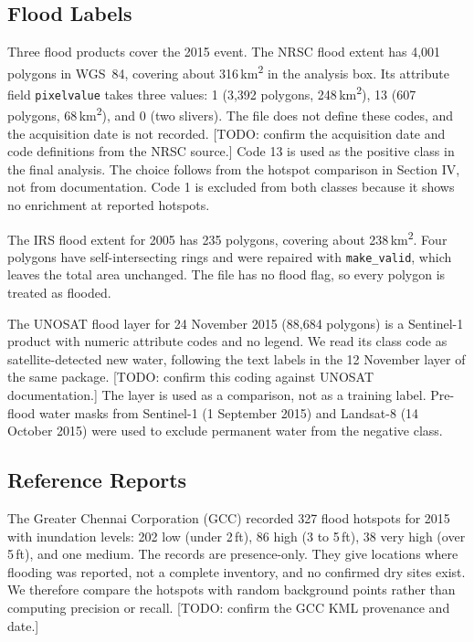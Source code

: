 \documentclass[conference]{IEEEtran}
\begin{document}
\subsection{Flood Labels}
Three flood products cover the 2015 event. The NRSC flood extent has 4,001 polygons in WGS~84, covering about 316\,km\textsuperscript{2} in the analysis box. Its attribute field \texttt{pixelvalue} takes three values: 1 (3,392 polygons, 248\,km\textsuperscript{2}), 13 (607 polygons, 68\,km\textsuperscript{2}), and 0 (two slivers). The file does not define these codes, and the acquisition date is not recorded. [TODO: confirm the acquisition date and code definitions from the NRSC source.] Code 13 is used as the positive class in the final analysis. The choice follows from the hotspot comparison in Section IV, not from documentation. Code 1 is excluded from both classes because it shows no enrichment at reported hotspots.

The IRS flood extent for 2005 has 235 polygons, covering about 238\,km\textsuperscript{2}. Four polygons have self-intersecting rings and were repaired with \texttt{make\_valid}, which leaves the total area unchanged. The file has no flood flag, so every polygon is treated as flooded.

The UNOSAT flood layer for 24 November 2015 (88,684 polygons) is a Sentinel-1 product with numeric attribute codes and no legend. We read its class code as satellite-detected new water, following the text labels in the 12 November layer of the same package. [TODO: confirm this coding against UNOSAT documentation.] The layer is used as a comparison, not as a training label. Pre-flood water masks from Sentinel-1 (1 September 2015) and Landsat-8 (14 October 2015) were used to exclude permanent water from the negative class.

\subsection{Reference Reports}
The Greater Chennai Corporation (GCC) recorded 327 flood hotspots for 2015 with inundation levels: 202 low (under 2\,ft), 86 high (3 to 5\,ft), 38 very high (over 5\,ft), and one medium. The records are presence-only. They give locations where flooding was reported, not a complete inventory, and no confirmed dry sites exist. We therefore compare the hotspots with random background points rather than computing precision or recall. [TODO: confirm the GCC KML provenance and date.]
\end{document}
